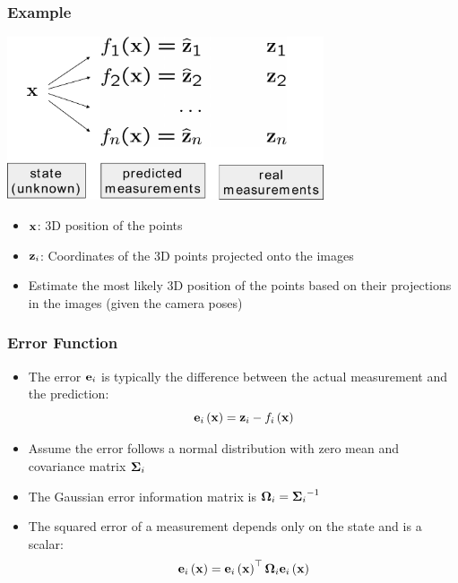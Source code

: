 \begin{frame}
    \frametitle{Example}
    
    \begin{center}
        \includegraphics[width=0.7\textwidth]{images/least_squares.pdf}
    \end{center}
    
    \begin{itemize}
        \item $\boldsymbol{\mathbf{x}}$: 3D position of the points
        \item $\boldsymbol{\mathbf{z}}_{i}$: Coordinates of the 3D points projected onto the images
        \item Estimate the most likely 3D position of the points based on their projections in the images (given the camera poses)
    \end{itemize}
\end{frame}

\begin{frame}
    \frametitle{Error Function}
    
    \begin{itemize}
        \item The error $\boldsymbol{\mathbf{e}}_{i}$ is typically the difference between the actual measurement and the prediction:
            \begin{equation*}
                \boldsymbol{\mathbf{e}}_{i}\left( \boldsymbol{\mathbf{x}} \right) = \boldsymbol{\mathbf{z}}_{i} - f_{i}\left( \boldsymbol{\mathbf{x}} \right)
            \end{equation*}
        \item Assume the error follows a normal distribution with zero mean and covariance matrix $\boldsymbol{\mathbf{\Sigma}}_{i}$
        \item The Gaussian error information matrix is $\boldsymbol{\mathbf{\Omega}}_{i} = {\boldsymbol{\mathbf{\Sigma}}_{i}}^{-1}$
        \item The squared error of a measurement depends only on the state and is a scalar:
            \begin{equation*}
                \boldsymbol{\mathbf{e}}_{i}\left( \boldsymbol{\mathbf{x}} \right) = \boldsymbol{\mathbf{e}}_{i}\left( \boldsymbol{\mathbf{x}} \right)^{\top} \boldsymbol{\mathbf{\Omega}}_{i} \boldsymbol{\mathbf{e}}_{i}\left( \boldsymbol{\mathbf{x}} \right)
            \end{equation*}
    \end{itemize}
\end{frame}

